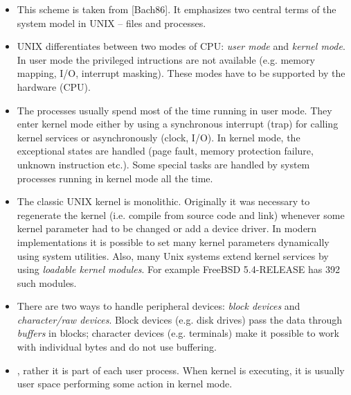 \begin{itemize}
\item This scheme is taken from [Bach86]. It emphasizes two central terms
of the system model in UNIX -- files and processes.
\item UNIX differentiates between two modes of CPU: \emph{user mode} and
\emph{kernel mode}. In user mode the privileged intructions are not
available (e.g. memory mapping, I/O, interrupt masking). These modes have to
be supported by the hardware (CPU).
\item The processes usually spend most of the time running in user mode.
They enter kernel mode either by using a synchronous interrupt (trap) for
calling kernel services or asynchronously (clock, I/O). In kernel mode,
the exceptional states are handled (page fault, memory protection failure,
unknown instruction etc.). Some special tasks are handled by system processes
running in kernel mode all the time.
\item The classic UNIX kernel is monolithic. Originally it was necessary to
regenerate the kernel (i.e. compile from source code and link) whenever some
kernel parameter had to be changed or add a device driver. In modern
implementations it is possible to set many kernel parameters dynamically using
system utilities. Also, many Unix systems extend kernel services by using
\emph{loadable kernel modules}. For example FreeBSD 5.4-RELEASE has 392 such
modules.
\item There are two ways to handle peripheral devices:
\emph{block devices} and \emph{character/raw devices}. Block devices (e.g.
disk drives) pass the data through \emph{buffers} in blocks; character devices
(e.g. terminals) make it possible to work with individual bytes and do not use
buffering.
\item {}, rather it is part of each
user process. When kernel is executing, it is usually user space performing some
action in kernel mode.
\end{itemize}



